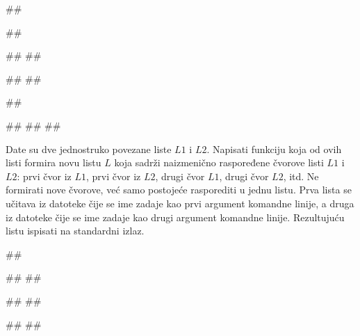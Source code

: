 \begin{Exercise}[difficulty=1, label=4_06]
\begin{miditest}
\begin{test}{3}
##

##

##
##

#\naslovIzlaz#
#\izlaz{[5, 6, 11, 12, 14, 16]}#
\end{test}
\end{miditest}
\begin{miditest}
\begin{test}{4}
##

#\naslovIzlazZaGresku# 
## 
##
\end{test}
\end{miditest}

\end{Exercise}
\begin{Answer}[ref=4_06]
\end{Answer}

\begin{Exercise}[difficulty=1,label=4_07]
Date su dve jednostruko povezane liste $L1$ i $L2$. Napisati funkciju koja od 
ovih listi formira novu listu $L$ koja sadrži naizmenično raspoređene čvorove 
listi $L1$ i $L2$: prvi čvor iz $L1$, prvi čvor iz $L2$, drugi čvor $L1$,
drugi čvor $L2$, itd. Ne formirati nove čvorove, već samo postojeće rasporediti u jednu listu. Prva lista se učitava iz datoteke čije se ime zadaje kao prvi argument komandne linije, a druga iz datoteke čije se ime zadaje kao 
drugi argument komandne linije. Rezultujuću listu ispisati na standardni izlaz. 


\begin{miditest}
\begin{test}{1}
##

##
##

##
##

#\naslovIzlaz#
##
\end{test}
\end{miditest}
\end{Exercise}

